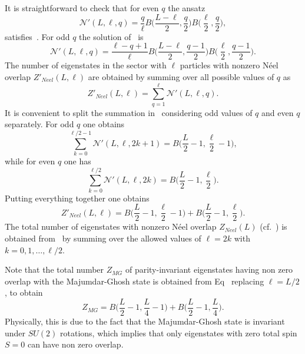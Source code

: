 \documentclass[11pt]{iopart}
\begin{document}
It is straightforward to check that for even $q$ the ansatz 
%
\begin{equation}
{\mathcal N}'(L,\ell,q)=\frac{q}{\ell}B\Big(\frac{L-\ell}{2},\frac{q}{2}\Big)
B\Big(\frac{\ell}{2},\frac{q}{2}\Big),
\end{equation}
% 
satisfies~. For odd $q$ the solution of~ is 
%
\begin{equation}
{\mathcal N}'(L,\ell,q)=\frac{\ell-q+1}{\ell}B\Big(\frac{L-\ell}{2},\frac{q-1}{2}
\Big)B\Big(\frac{\ell}{2},\frac{q-1}{2}\Big).
\end{equation}
%
The number of eigenstates in the sector with $\ell$ particles with nonzero 
N\'eel overlap $Z'_{Neel}(L,\ell)$ are obtained by summing over all possible values 
of $q$ as 
%
\begin{equation}
\label{sum1}
Z'_{Neel}(L,\ell)=\sum\limits_{q=1}^\ell {\mathcal N}'(L,\ell,q).
\end{equation}
%
It is convenient to split the summation in~ considering odd values of $q$ 
and even $q$ separately. For odd $q$ one obtains 
%
\begin{equation}
\sum\limits_{k=0}^{\ell/2-1} {\mathcal N}'(L,\ell,2k+1)=B\Big(\frac{L}{2}-1,
\frac{\ell}{2}-1\Big),
\end{equation}
%
while for even $q$ one has 
%
\begin{equation}
\sum\limits_{k=0}^{\ell/2} {\mathcal N}'(L,\ell,2k)=B\Big(\frac{L}{2}-1,
\frac{\ell}{2}\Big). 
\end{equation}
%
Putting everything together one obtains 
%
\begin{equation}
\label{N-count-p}
Z'_{Neel}(L,\ell)=B\Big(\frac{L}{2}-1,
\frac{\ell}{2}-1\Big)+B\Big(\frac{L}{2}-1,
\frac{\ell}{2}\Big). 
\end{equation}
%
The total number of eigenstates with nonzero N\'eel overlap $Z_{Neel}(L)$ 
(cf.~) is obtained from~ by summing over 
the allowed values of $\ell=2k$ with $k=0,1,\dots,\ell/2$. 

Note that the total number $Z_{MG}$ of parity-invariant eigenstates having non 
zero overlap with the Majumdar-Ghosh state is obtained from Eq~ 
replacing $\ell=L/2$, to obtain 
%
\begin{equation}
\label{p-inv-mg}
Z_{MG}=B\Big(\frac{L}{2}-1,\frac{L}{4}-1\Big)+B\Big(\frac{L}{2}-1,\frac{L}{4}
\Big). 
\end{equation}
%
Physically, this is due to the fact that the 
Majumdar-Ghosh state is invariant under $SU(2)$ rotations, which implies 
that only eigenstates with zero total spin $S=0$ can have non zero overlap. 
\end{document}
